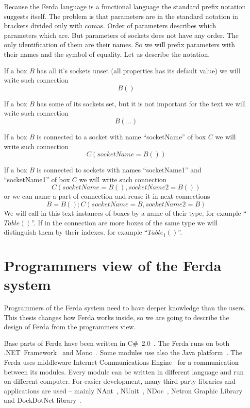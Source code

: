 \documentclass[a4paper,12pt]{book}
\begin{document}
Because the Ferda language is a functional language the standard prefix notation suggests itself. The problem is that parameters are in the standard notation in brackets divided only with comas. Order of parameters describes which parameters which are. But parameters of sockets does not have any order. The only identification of them are their names. So we will prefix parameters with their names and the symbol of equality. Let us describe the notation.

If a box $B$ has all it's sockets unset (all properties has its default value) we will write such connection
\begin{equation}
B()
\end{equation}

If a box $B$ has some of its sockets set, but it is not important for the text we will write such connection
\begin{equation}
B(\dots)
\end{equation}

If a box $B$ is connected to a socket with name ``socketName'' of box $C$ we will write such connection
\begin{equation}
C(socketName=B())
\end{equation}

If a box $B$ is connected to sockets with names ``socketName1'' and ``socketName1'' of box $C$ we will write such connection
\begin{equation}
C(socketName=B(), socketName2=B())
\end{equation}
or we can name a part of connection and reuse it in next connections
\begin{equation}
B=B(); C(socketName=B, socketName2=B)
\end{equation}
We will call in this text instances of boxes by a name of their type, for example ``$Table()$''. If in the connection are more boxes of the same type we will distinguish them by their indexes, for example ``$Table_1()$''.

\section{Programmers view of the Ferda system}
Programmers of the Ferda system need to have deeper knowledge than the users. This thesis changes how Ferda works inside, so we are going to describe the design of Ferda from the programmers view.

Base parts of Ferda have been written in C\#~2.0~\cite{WikiCSharp}. The Ferda runs on both .NET~Framework~\cite{WikiDotNet} and Mono~\cite{WikiMono}. Some modules use also the Java platform~\cite{WikiJava}. The Ferda uses middleware Internet Communications Engine~\cite{WikiIce} for a communication between its modules. Every module can be written in different language and run on different computer. For easier development, many third party libraries and applications are used -- mainly NAnt~\cite{NAnt}, NUnit~\cite{NUnit}, NDoc~\cite{NDoc}, Netron Graphic Library~\cite{Netron} and DockDotNet library~\cite{DockDotNet}.
\end{document}
